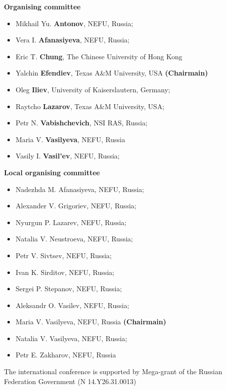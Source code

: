 \documentclass[8pt]{article}
\begin{document}


\newpage 

\begin{center}

\begin{center}
\textbf{Organising committee}
\end{center}

\begin{itemize}
\item[] Mikhail Yu. \textbf{Antonov}, NEFU, Russia;
\item[] Vera I. \textbf{Afanasiyeva}, NEFU, Russia; 
\item[] Eric T. \textbf{Chung}, The Chinese University of Hong Kong
\item[] Yalchin \textbf{Efendiev}, Texas A\&M University, USA
\hfill \textbf{(Chairmain)}
\item[] Oleg \textbf{Iliev}, University of Kaiserslautern, Germany;
\item[] Raytcho \textbf{Lazarov}, Texas A\&M University, USA; 
\item[] Petr N. \textbf{Vabishchevich}, NSI RAS, Russia; 
\item[] Maria V. \textbf{Vasilyeva}, NEFU, Russia
\item[] Vasily I. \textbf{Vasil'ev}, NEFU, Russia; 
\end{itemize}

\begin{center}
\textbf{Local organising committee}
\end{center}

\begin{itemize}
\item[] Nadezhda M. Afanasiyeva, NEFU, Russia;
\item[] Alexander V. Grigoriev, NEFU, Russia;
\item[] Nyurgun P. Lazarev, NEFU, Russia;
\item[] Natalia V. Neustroeva, NEFU, Russia;
\item[] Petr V. Sivtsev, NEFU, Russia;
\item[] Ivan K. Sirditov, NEFU, Russia;
\item[] Sergei P. Stepanov, NEFU, Russia;
\item[] Aleksandr O. Vasilev, NEFU, Russia;
\item[] Maria V. Vasilyeva, NEFU, Russia
\hfill \textbf{(Chairmain)}
\item[] Natalia V. Vasilyeva, NEFU, Russia;
\item[] Petr E. Zakharov, NEFU, Russia
\end{itemize}

\vfill
The international conference is supported by Mega-grant of the Russian Federation Government (N 14.Y26.31.0013)

\end{center}
\end{document}
